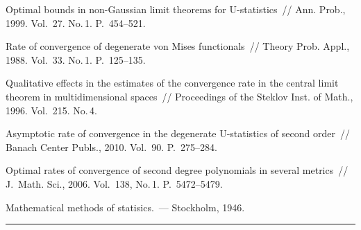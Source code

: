 \begin{multicols}{2}
  {\small\frenchspacing
{%
\begin{thebibliography}{9}
  
    Optimal bounds in non-Gaussian limit
      theorems for U-statistics~// Ann. Prob., 1999.
      Vol.~27. No.\,1. P.~454--521.


Rate of convergence of degenerate von Mises functionals~// Theory Prob. Appl., 
1988. Vol.~33. No.\,1. P.~125--135.




Qualitative effects in the estimates of the
convergence rate in the central limit theorem in
multidimensional spaces~// Proceedings of the Steklov Inst. of
      Math., 1996. Vol.~215. No.\,4. 


Asymptotic rate of convergence in the degenerate U-statistics of second order~//
Banach Center Publs., 2010. Vol.~90.  P.~275--284.


Optimal rates of convergence of second degree
polynomials in several metrics~// J.~Math. Sci., 2006.
Vol.~138, No.\,1. P.~5472--5479.

Mathematical methods of statisics.~--- Stockholm, 1946.


\end{thebibliography}
}
}


\end{multicols}

\vspace*{6pt}

\hrule

\vspace*{6pt}


